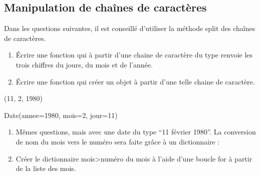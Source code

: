 \documentclass[letterpaper,10pt,english]{sphinxhowto}
\begin{document}
\subsection{Manipulation de chaînes de caractères}
\label{\detokenize{devoir_maison_Devoir Maison:manipulation-de-chaines-de-caracteres}}
\sphinxAtStartPar
Dans les questions suivantes, il est conseillé d’utiliser la méthode split des chaînes de caractères.
\begin{enumerate}
%
\setcounter{enumi}{10}
\item {} 
\sphinxAtStartPar
Écrire une fonction qui à partir d’une chaine de caractère du type  renvoie les trois chiffres du jours, du mois et de l’année.

\item {} 
\sphinxAtStartPar
Écrire une fonction qui créer un objet  à partir d’une telle chaine de caractère.

\end{enumerate}

\begin{sphinxVerbatim}[commandchars=\\\{\}]
\end{sphinxVerbatim}

\begin{sphinxVerbatim}[commandchars=\\\{\}]
(11, 2, 1980)
\end{sphinxVerbatim}

\begin{sphinxVerbatim}[commandchars=\\\{\}]
Date(annee=1980, mois=2, jour=11)
\end{sphinxVerbatim}
\begin{enumerate}
%
\setcounter{enumi}{12}
\item {} 
\sphinxAtStartPar
Mêmes questions, mais avec une date du type “11 février 1980”. La conversion de nom du mois vers le numéro sera faite grâce à un dictionnaire : 

\item {} 
\sphinxAtStartPar
Créer le dictionnaire mois\sphinxhyphen{}>numéro du mois à l’aide d’une boucle for à partir de la liste des mois.

\end{enumerate}
\end{document}

